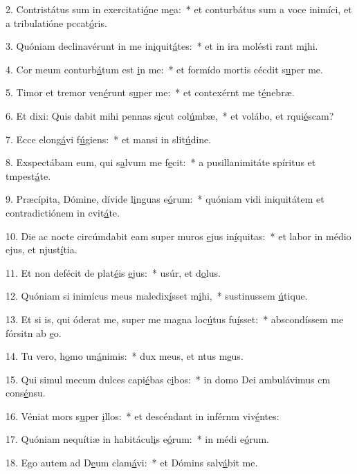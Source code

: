 2. Contristátus sum in exercitati\uline{ó}ne m\uline{e}a:~* et conturbátus sum a voce inimíci, et a tribulatióne pccat\uline{ó}ris.\par 
3. Quóniam declinavérunt in me in\uline{i}quit\uline{á}tes:~* et in ira molésti rant m\uline{i}hi.\par 
4. Cor meum conturb\uline{á}tum est \uline{i}n me:~* et formído mortis cécdit s\uline{u}per me.\par 
5. Timor et tremor ven\uline{é}runt s\uline{u}per me:~* et contexérnt me t\uline{é}nebræ.\par 
6. Et dixi: Quis dabit mihi pennas s\uline{i}cut col\uline{ú}mbæ,~* et volábo, et rqui\uline{é}scam?\par 
7. Ecce elong\uline{á}vi f\uline{ú}giens:~* et mansi in slit\uline{ú}dine.\par 
8. Exspectábam eum, qui s\uline{a}lvum me f\uline{e}cit:~* a pusillanimitáte spíritus et tmpest\uline{á}te.\par 
9. Præcípita, Dómine, dívide l\uline{i}nguas e\uline{ó}rum:~* quóniam vidi iniquitátem et contradictiónem in cvit\uline{á}te.\par 
10. Die ac nocte circúmdabit eam super muros \uline{e}jus in\uline{í}quitas:~* et labor in médio ejus, et njust\uline{í}tia.\par 
11. Et non defécit de plat\uline{é}is \uline{e}jus:~* usúr, et d\uline{o}lus.\par 
12. Quóniam si inimícus meus maledix\uline{í}sset m\uline{i}hi,~* sustinussem \uline{ú}tique.\par 
13. Et si is, qui óderat me, super me magna loc\uline{ú}tus fu\uline{í}sset:~* abscondíssem me fórsitn ab \uline{e}o.\par 
14. Tu vero, h\uline{o}mo un\uline{á}nimis:~* dux meus, et ntus m\uline{e}us.\par 
15. Qui simul mecum dulces capi\uline{é}bas c\uline{i}bos:~* in domo Dei ambulávimus cm cons\uline{é}nsu.\par 
16. Véniat mors s\uline{u}per \uline{i}llos:~* et descéndant in inférnm viv\uline{é}ntes:\par 
17. Quóniam nequítiæ in habitácul\uline{i}s e\uline{ó}rum:~* in médi e\uline{ó}rum.\par 
18. Ego autem ad D\uline{e}um clam\uline{á}vi:~* et Dómins salv\uline{á}bit me.\par 
